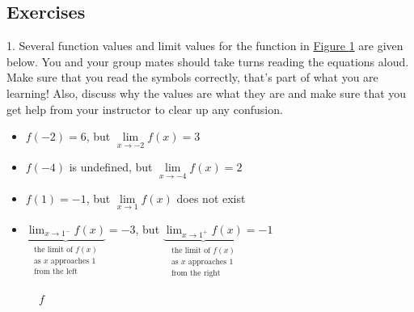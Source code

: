 \documentclass[12pt,]{book}
\theoremstyle{plain}
\theoremstyle{definition}
\numberwithin{equation}{section}
\newcommand{\fe}[2]{#1\mathopen{}\left(#2\right)\mathclose{}}
\begin{document}
\subsection[Exercises]{Exercises}\label{exercises-5}
\begin{exerciselist}
\item[1.]\hypertarget{exercise-46}{\null}Several function values and limit values for the function in \hyperref[figure-first-limit]{Figure \ref{figure-first-limit}} are given below. You and your group mates should take turns reading the equations aloud. Make sure that you read the symbols correctly, that's part of what you are learning! Also, discuss why the values are what they are and make sure that you get help from your instructor to clear up any confusion.%
\begin{itemize}[label=\textbullet]
\item{}\(\fe{f}{-2}=6\), but \(\lim\limits_{x\to-2}\fe{f}{x}=3\)\item{}\(\fe{f}{-4}\) is undefined, but \(\lim\limits_{x\to-4}\fe{f}{x}=2\)\item{}\(\fe{f}{1}=-1\), but \(\lim\limits_{x\to1}\fe{f}{x}\) does not exist\item{}\(\underbrace{\lim_{x\to1^{-}}\fe{f}{x}}_{\begin{array}{c}\text{the limit of }\fe{f}{x}\\\text{as }x\text{ approaches }1\\\text{from the left}\end{array}}=-3\), but \(\underbrace{\lim_{x\to1^{+}}\fe{f}{x}}_{\begin{array}{c}\text{the limit of }\fe{f}{x}\\\text{as }x\text{ approaches }1\\\text{from the right}\end{array}}=-1\)\end{itemize}
\begin{figure}
\centering
{
}
\caption{\(f\)\label{figure-first-limit}}
\end{figure}
\par\smallskip
\end{exerciselist}
\end{document}
